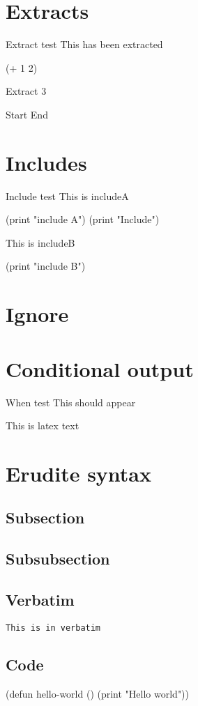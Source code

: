 \documentclass[11pt,pdflatex,makeidx]{scrbook}   %
\begin{document}
\section{Extracts}

Extract test
This has been extracted
\begin{code}
(+ 1 2)
\end{code}

Extract 3

Start
End

\section{Includes}

Include test
This is includeA
\begin{code}
(print "include A")
(print "Include")
\end{code}
This is includeB
\begin{code}
(print "include B")
\end{code}

\section{Ignore}


\section{Conditional output}
When test
This should appear

This is latex text

\section{Erudite syntax}
\subsection{Subsection}
\subsection{Subsubsection}

\subsection{Verbatim}
\begin{verbatim}
This is in verbatim
\end{verbatim}

\subsection{Code}
\begin{code}
(defun hello-world ()
(print "Hello world"))
\end{code}
\end{document}
